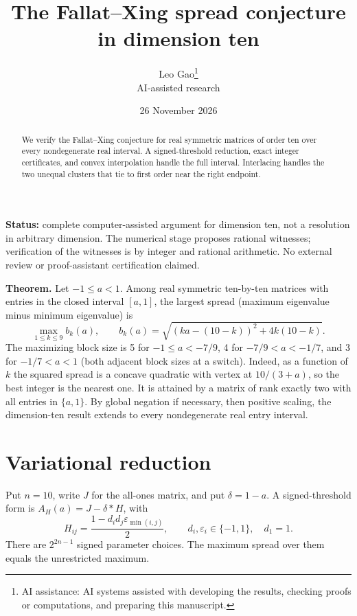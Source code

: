 \documentclass[11pt]{article}
\title{\textcolor{ink}{The Fallat--Xing spread conjecture in dimension ten}}
\author{Leo Gao\thanks{AI assistance: AI systems assisted with developing the results, checking proofs or computations, and preparing this manuscript.}\\[3pt]\small\textsf{AI-assisted research}}
\date{26 November 2026}
\begin{document}
\maketitle
\begin{abstract}
We verify the Fallat–Xing conjecture for real symmetric matrices of order ten over every nondegenerate real interval. A signed-threshold reduction, exact integer certificates, and convex interpolation handle the full interval. Interlacing handles the two unequal clusters that tie to first order near the right endpoint.
\end{abstract}
\textbf{Status:} complete computer-assisted argument for dimension ten, not a resolution in arbitrary dimension. The numerical stage proposes rational witnesses; verification of the witnesses is by integer and rational arithmetic. No external review or proof-assistant certification claimed.

\textbf{Theorem.} Let \(-1 \le  a < 1\). Among real symmetric ten-by-ten matrices with entries in the closed interval \([a,1]\), the largest spread (maximum eigenvalue minus minimum eigenvalue) is
\[
\max_{1\le k\le 9} b_k(a),\qquad b_k(a)=\sqrt{(ka-(10-k))^2+4k(10-k)}.
\]
The maximizing block size is 5 for \(-1\le a<-7/9\), 4 for \(-7/9<a<-1/7\), and 3 for \(-1/7<a<1\) (both adjacent block sizes at a switch). Indeed, as a function of \(k\) the squared spread is a concave quadratic with vertex at \(10/(3+a)\), so the best integer is the nearest one. It is attained by a matrix of rank exactly two with all entries in \(\{a,1\}\). By global negation if necessary, then positive scaling, the dimension-ten result extends to every nondegenerate real entry interval.

\section{Variational reduction}\label{variational-reduction}

Put \(n=10\), write \(J\) for the all-ones matrix, and put \(\delta =1-a\). A signed-threshold form is \(A_H(a)=J-\delta *H\), with
\[
H_{ij}=\frac{1-d_i d_j\varepsilon_{\min(i,j)}}2,\qquad d_i,\varepsilon_i\in\{-1,1\},\quad d_1=1.
\]
There are \(2^{2n-1}\) signed parameter choices. The maximum spread over them equals the unrestricted maximum.
\end{document}
